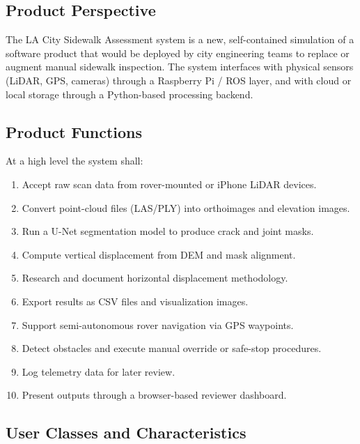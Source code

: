 \documentclass{article}
\begin{document}
\subsection{Product Perspective}
The LA City Sidewalk Assessment system is a new, self-contained simulation of a software product
that would be deployed by city engineering teams to replace or augment manual sidewalk inspection.
The system interfaces with physical sensors (LiDAR, GPS, cameras) through a Raspberry Pi / ROS
layer, and with cloud or local storage through a Python-based processing backend.

\subsection{Product Functions}
At a high level the system shall:
\begin{enumerate}
  \item Accept raw scan data from rover-mounted or iPhone LiDAR devices.
  \item Convert point-cloud files (LAS/PLY) into orthoimages and elevation images.
  \item Run a U-Net segmentation model to produce crack and joint masks.
  \item Compute vertical displacement from DEM and mask alignment.
  \item Research and document horizontal displacement methodology.
  \item Export results as CSV files and visualization images.
  \item Support semi-autonomous rover navigation via GPS waypoints.
  \item Detect obstacles and execute manual override or safe-stop procedures.
  \item Log telemetry data for later review.
  \item Present outputs through a browser-based reviewer dashboard.
\end{enumerate}

\subsection{User Classes and Characteristics}
\end{document}
